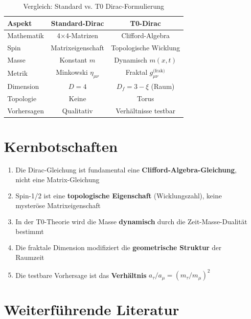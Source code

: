 	\begin{table}[h]
		\centering
		\begin{tabular}{lcc}
			\toprule
			\textbf{Aspekt} & \textbf{Standard-Dirac} & \textbf{T0-Dirac} \\
			\midrule
			Mathematik & 4×4-Matrizen & Clifford-Algebra \\
			Spin & Matrixeigenschaft & Topologische Wicklung \\
			Masse & Konstant $m$ & Dynamisch $m(x,t)$ \\
			Metrik & Minkowski $\eta_{\mu\nu}$ & Fraktal $g_{\mu\nu}^{\text{(frak)}}$ \\
			Dimension & $D = 4$ & $D_f = 3 - \xi$ (Raum) \\
			Topologie & Keine & Torus \\
			Vorhersagen & Qualitativ & Verhältnisse testbar \\
			\bottomrule
		\end{tabular}
		\caption{Vergleich: Standard vs. T0 Dirac-Formulierung}
	\end{table}
	
	\section{Kernbotschaften}
	
	\begin{enumerate}
		\item Die Dirac-Gleichung ist fundamental eine \textbf{Clifford-Algebra-Gleichung}, 
		nicht eine Matrix-Gleichung
		
		\item Spin-1/2 ist eine \textbf{topologische Eigenschaft} (Wicklungszahl), 
		keine mysteröse Matrixeigenschaft
		
		\item In der T0-Theorie wird die Masse \textbf{dynamisch} durch die 
		Zeit-Masse-Dualität bestimmt
		
		\item Die fraktale Dimension modifiziert die \textbf{geometrische Struktur} 
		der Raumzeit
		
		\item Die testbare Vorhersage ist das \textbf{Verhältnis} 
		$a_\tau/a_\mu = (m_\tau/m_\mu)^2$
	\end{enumerate}
	
	\section*{Weiterführende Literatur}
	
